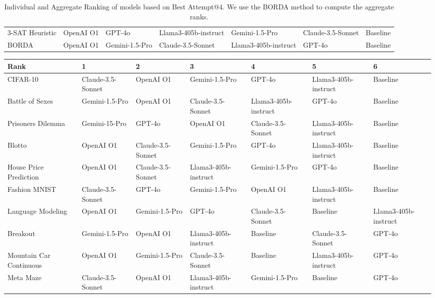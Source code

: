 \begin{table*}[!htb]
\begin{adjustbox}{width=\textwidth}
\begin{NiceTabular}{lllllll}
        3-SAT Heuristic & OpenAI O1 & GPT-4o & Llama3-405b-instruct & Gemini-1.5-Pro & Claude-3.5-Sonnet & Baseline \\
        BORDA & OpenAI O1 & Gemini-1.5-Pro & Claude-3.5-Sonnet & Llama3-405b-instruct & GPT-4o & Baseline \\
        \bottomrule
    \end{NiceTabular}
    \end{adjustbox}
    \caption{Individual and Aggregate Ranking of models based on Best Attempt@4. We use the BORDA method to compute the aggregate ranks.}
    \label{tab:ba_ranks}
\end{table*}

\begin{table}[!htb]
    \centering
    \begin{adjustbox}{width=\textwidth}
    \begin{NiceTabular}{lllllll}
        \toprule
        Rank & 1 & 2 & 3 & 4 & 5 & 6 \\
        \midrule
        CIFAR-10 & Claude-3.5-Sonnet & OpenAI O1 & Gemini-1.5-Pro & GPT-4o & Llama3-405b-instruct & Baseline \\
        Battle of Sexes & Gemini-1.5-Pro & OpenAI O1 & Claude-3.5-Sonnet & Llama3-405b-instruct & GPT-4o & Baseline \\
        Prisoners Dilemma & Gemini-15-Pro & GPT-4o & OpenAI O1 & Claude-3.5-Sonnet & Llama3-405b-instruct & Baseline \\
        Blotto & OpenAI O1 & Claude-3.5-Sonnet & Gemini-1.5-Pro & GPT-4o & Llama3-405b-instruct & Baseline \\
        House Price Prediction & OpenAI O1 & Claude-3.5-Sonnet & Llama3-405b-instruct & Gemini-1.5-Pro & GPT-4o & Baseline \\
        Fashion MNIST & Claude-3.5-Sonnet & GPT-4o & Gemini-1.5-Pro & OpenAI O1 & Llama3-405b-instruct & Baseline \\
        Language Modeling & OpenAI O1 & Gemini-1.5-Pro & GPT-4o & Claude-3.5-Sonnet & Baseline & Llama3-405b-instruct \\
        Breakout & Gemini-1.5-Pro & OpenAI O1 & Llama3-405b-instruct & Baseline & Claude-3.5-Sonnet & GPT-4o \\
        Mountain Car Continuous & OpenAI O1 & Gemini-1.5-Pro & Claude-3.5-Sonnet & Baseline & Llama3-405b-instruct & GPT-4o \\
        Meta Maze & Claude-3.5-Sonnet & OpenAI O1 & Llama3-405b-instruct & Gemini-1.5-Pro & Baseline & GPT-4o \\

\end{NiceTabular}
\end{adjustbox}
\end{table}
